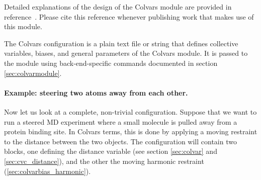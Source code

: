 Detailed explanations of the design of the Colvars module are provided in reference~\cite{Fiorin2013}. Please cite this reference whenever publishing work that makes use of this module.




The Colvars configuration is a plain text file or string that defines collective variables, biases, and general parameters of the Colvars module.
It is passed to the module using back-end-specific commands documented in section \ref{sec:colvarmodule}.


\paragraph*{Example: steering two atoms away from each other.}

Now let us look at a complete, non-trivial configuration.
Suppose that we want to run a steered MD experiment where a small molecule is pulled away from a protein binding site.
In Colvars terms, this is done by applying a moving restraint to the distance between the two objects.
The configuration will contain two blocks, one defining the distance variable (see section \ref{sec:colvar} and \ref{sec:cvc_distance}), and the other the moving harmonic restraint (\ref{sec:colvarbias_harmonic}).

